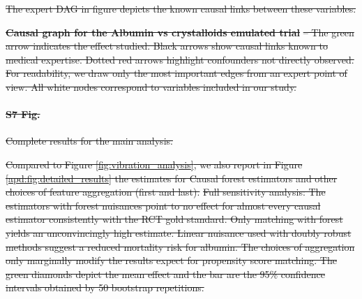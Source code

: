 \documentclass[10pt,letterpaper]{article}
\providecommand{\DIFdeltex}[1]{{\protect\color{red}\sout{#1}}}                      %
\providecommand{\DIFdelFL}[1]{\DIFdel{#1}} %
\providecommand{\DIFdel}[1]{\texorpdfstring{\DIFdeltex{#1}}{}} %
\begin{document}
\DIFdel{The expert DAG in figure depicts the known causal links between these
  variables.
}%

{%
  \textbf{\DIFdelFL{Causal graph for the Albumin vs crystalloids emulated
      trial}} %
  \DIFdelFL{-- The
    green arrow indicates the effect studied. Black arrows show causal links
    known to medical expertise. Dotted red arrows highlight confounders not directly
    observed. For readability, we draw only the most important edges from an
    expert point of view. All white nodes correspond to variables included in
    our study.}}%

\paragraph*{\DIFdel{S7 Fig.}}
\DIFdel{Complete results for the main analysis.}%

\DIFdel{Compared to Figure \ref{fig:vibration_analysis}, we also report in
  Figure \ref{apd:fig:detailed_results} the estimates for Causal forest
  estimators and other choices of feature aggregation (first and last).
}%
{%
  \DIFdelFL{Full sensitivity analysis: The estimators with forest nuisances
    point to no effect for almost every causal estimator consistently with the
    RCT gold standard. Only matching with forest yields an unconvincingly high
    estimate. Linear nuisance used with doubly robust methods suggest a
    reduced mortality risk for albumin. The choices of aggregation only
    marginally modify the results expect for propensity score matching. The
    green diamonds depict the mean effect and the bar are the 95\% confidence
    intervals obtained by 50 bootstrap
    repetitions.}}%
\end{document}
